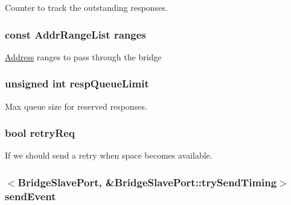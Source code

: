 \label{classBridge_1_1BridgeSlavePort_a3d6ba4ec7b15c09dd3e5d3c23c1f174f}
Counter to track the outstanding responses. \hypertarget{classBridge_1_1BridgeSlavePort_aa51746d80e2118c6d1c670fcd6d6169e}{
\subsubsection[{ranges}]{\setlength{\rightskip}{0pt plus 5cm}const {\bf AddrRangeList} {\bf ranges}}}
\label{classBridge_1_1BridgeSlavePort_aa51746d80e2118c6d1c670fcd6d6169e}
\hyperlink{classAddress}{Address} ranges to pass through the bridge \hypertarget{classBridge_1_1BridgeSlavePort_a1da989012dff28370bdcf58a69d6769a}{
\subsubsection[{respQueueLimit}]{\setlength{\rightskip}{0pt plus 5cm}unsigned int {\bf respQueueLimit}}}
\label{classBridge_1_1BridgeSlavePort_a1da989012dff28370bdcf58a69d6769a}
Max queue size for reserved responses. \hypertarget{classBridge_1_1BridgeSlavePort_aab3b947b2633a30b5973a39b7e9b018a}{
\subsubsection[{retryReq}]{\setlength{\rightskip}{0pt plus 5cm}bool {\bf retryReq}}}
\label{classBridge_1_1BridgeSlavePort_aab3b947b2633a30b5973a39b7e9b018a}
If we should send a retry when space becomes available. \hypertarget{classBridge_1_1BridgeSlavePort_ae68804297f24d50ce6d825eccd46b6af}{
\subsubsection[{sendEvent}]{$<${\bf BridgeSlavePort}, \&BridgeSlavePort::trySendTiming$>$ {\bf sendEvent}}}
